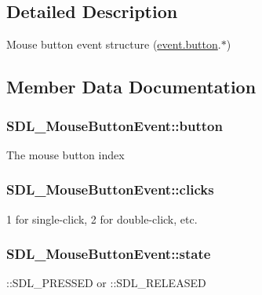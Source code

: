 \subsection{Detailed Description}
Mouse button event structure (\hyperlink{unionSDL__Event_ab6da2fa2687e5f849f270adecc64785f}{event.\+button}.$\ast$) 

\subsection{Member Data Documentation}
\hypertarget{structSDL__MouseButtonEvent_a1a4680e19ae06d02d2093f0bcba1b24c}{}
\subsubsection[{button}]{ S\+D\+L\+\_\+\+Mouse\+Button\+Event\+::button}\label{structSDL__MouseButtonEvent_a1a4680e19ae06d02d2093f0bcba1b24c}
The mouse button index \hypertarget{structSDL__MouseButtonEvent_aa606bebcbc3ffc7e932016039c2a36a1}{}
\subsubsection[{clicks}]{ S\+D\+L\+\_\+\+Mouse\+Button\+Event\+::clicks}\label{structSDL__MouseButtonEvent_aa606bebcbc3ffc7e932016039c2a36a1}
1 for single-\/click, 2 for double-\/click, etc. \hypertarget{structSDL__MouseButtonEvent_a8809cef85cfffad4f2059f2ba4fc6a3d}{}
\subsubsection[{state}]{ S\+D\+L\+\_\+\+Mouse\+Button\+Event\+::state}\label{structSDL__MouseButtonEvent_a8809cef85cfffad4f2059f2ba4fc6a3d}
\+::\+S\+D\+L\+\_\+\+P\+R\+E\+S\+S\+E\+D or \+::\+S\+D\+L\+\_\+\+R\+E\+L\+E\+A\+S\+E\+D \hypertarget{structSDL__MouseButtonEvent_af64cb09ea68b8081ecc8ee498552e3d7}{}
